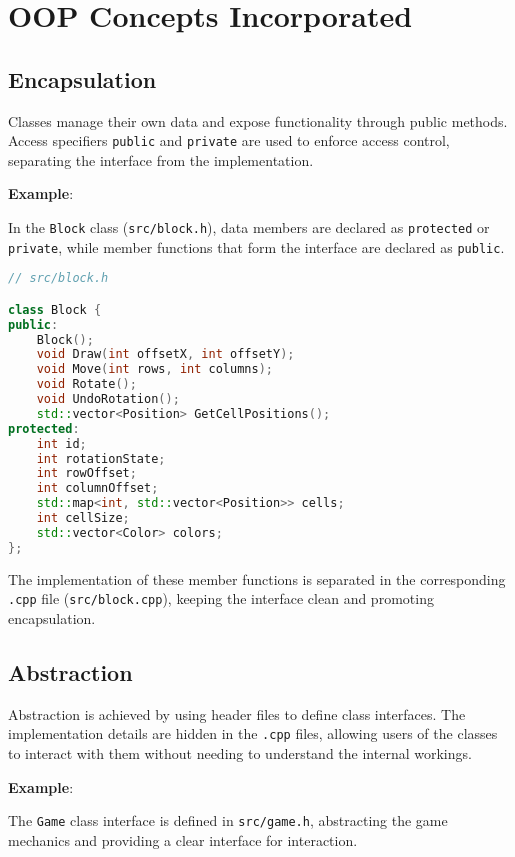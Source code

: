 \documentclass{article}
\begin{document}
\section{OOP Concepts Incorporated}

\subsection{Encapsulation}

Classes manage their own data and expose functionality through public methods. Access specifiers \texttt{public} and \texttt{private} are used to enforce access control, separating the interface from the implementation.

\textbf{Example}:

In the \texttt{Block} class (\texttt{src/block.h}), data members are declared as \texttt{protected} or \texttt{private}, while member functions that form the interface are declared as \texttt{public}.

\begin{lstlisting}[language=C++]
// src/block.h

class Block {
public:
    Block();
    void Draw(int offsetX, int offsetY);
    void Move(int rows, int columns);
    void Rotate();
    void UndoRotation();
    std::vector<Position> GetCellPositions();
protected:
    int id;
    int rotationState;
    int rowOffset;
    int columnOffset;
    std::map<int, std::vector<Position>> cells;
    int cellSize;
    std::vector<Color> colors;
};
\end{lstlisting}

The implementation of these member functions is separated in the corresponding \texttt{.cpp} file (\texttt{src/block.cpp}), keeping the interface clean and promoting encapsulation.

\subsection{Abstraction}

Abstraction is achieved by using header files to define class interfaces. The implementation details are hidden in the \texttt{.cpp} files, allowing users of the classes to interact with them without needing to understand the internal workings.

\textbf{Example}:

The \texttt{Game} class interface is defined in \texttt{src/game.h}, abstracting the game mechanics and providing a clear interface for interaction.
\end{document}
